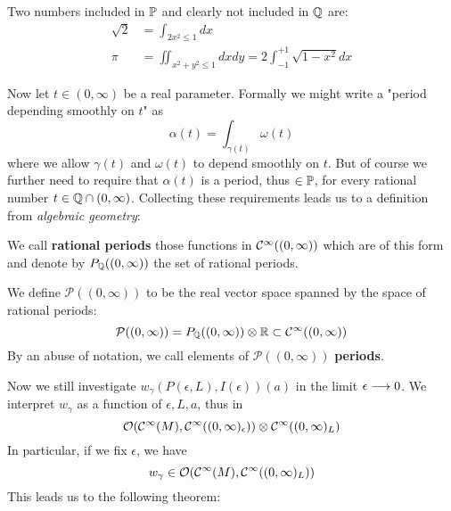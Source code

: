 \begin{example}
  Two numbers included in $\mathbb{P}$ and clearly not included in $\mathbb{Q}$ are:
  \begin{align*}
    \sqrt{2} &= \int_{2x^2 \leq 1} dx \\
    \pi &= \iint_{x^2+y^2\leq 1} dx dy = 2 \int_{-1}^{+1} \sqrt{1-x^2} dx
  \end{align*}
\end{example}

Now let $t \in (0, \infty)$ be a real parameter. Formally we might write a "period depending smoothly on $t$" as
$$ \alpha(t) = \int_{\gamma(t)} \omega(t) $$
where we allow $\gamma(t)$ and $\omega(t)$ to depend smoothly on $t$. But of course we further need to require that $\alpha(t)$ is a period, thus $\in \mathbb{P}$, for every rational number $t \in \mathbb{Q} \cap (0,\infty)$. Collecting these requirements leads us to a definition from \emph{algebraic geometry}:

\begin{definition}
  We call \textbf{rational periods} those functions in $\mathcal{C}^{\infty}((0,\infty))$ which are of this form and denote by $P_{\mathbb{Q}}((0,\infty))$ the set of rational periods.
\end{definition}

\begin{definition}
  We define $\mathcal{P}((0,\infty))$ to be the real vector space spanned by the space of rational periods:
  $$ \mathcal{P}((0,\infty)) = P_{\mathbb{Q}}((0,\infty)) \otimes \mathbb{R} \subset \mathcal{C}^{\infty}((0,\infty)) $$
  By an abuse of notation, we call elements of $\mathcal{P}((0,\infty))$ \textbf{periods}.
\end{definition}

Now we still investigate $w_\gamma(P(\epsilon,L), I(\epsilon))(a)$ in the limit $\epsilon \lra 0$. We interpret $w_\gamma$ as a function of $\epsilon,L,a$, thus in
$$ \OO(\Ci(M), \Ci((0,\infty)_\epsilon)) \otimes \Ci((0,\infty)_L) $$
In particular, if we fix $\epsilon$, we have
$$ w_\gamma \in \mathcal{O}(\mathcal{C}^{\infty}(M), \mathcal{C}^{\infty}((0,\infty)_L)) $$
This leads us to the following theorem:

